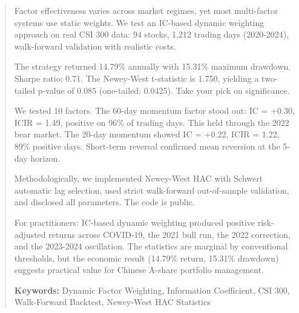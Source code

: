 \begin{abstract}

Factor effectiveness varies across market regimes, yet most multi-factor systems use static weights. We test an IC-based dynamic weighting approach on real CSI 300 data: 94 stocks, 1,212 trading days (2020-2024), walk-forward validation with realistic costs.

The strategy returned 14.79\% annually with 15.31\% maximum drawdown. Sharpe ratio: 0.71. The Newey-West t-statistic is 1.750, yielding a two-tailed p-value of 0.085 (one-tailed: 0.0425). Take your pick on significance.

We tested 10 factors. The 60-day momentum factor stood out: IC = +0.30, ICIR = 1.49, positive on 96\% of trading days. This held through the 2022 bear market. The 20-day momentum showed IC = +0.22, ICIR = 1.22, 89\% positive days. Short-term reversal confirmed mean reversion at the 5-day horizon.

Methodologically, we implemented Newey-West HAC with Schwert automatic lag selection, used strict walk-forward out-of-sample validation, and disclosed all parameters. The code is public.

For practitioners: IC-based dynamic weighting produced positive risk-adjusted returns across COVID-19, the 2021 bull run, the 2022 correction, and the 2023-2024 oscillation. The statistics are marginal by conventional thresholds, but the economic result (14.79\% return, 15.31\% drawdown) suggests practical value for Chinese A-share portfolio management.

\textbf{Keywords:} Dynamic Factor Weighting, Information Coefficient, CSI 300, Walk-Forward Backtest, Newey-West HAC Statistics

\end{abstract}
